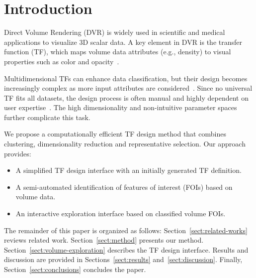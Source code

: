 \section{Introduction}
\label{sect:introduction}

Direct Volume Rendering (DVR) is widely used in scientific and medical applications to visualize 3D scalar data. A key element in DVR is the transfer function (TF), which maps volume data attributes (e.g., density) to visual properties such as color and opacity~\cite{ljung2016}.

Multidimensional TFs can enhance data classification, but their design becomes increasingly complex as more input attributes are considered~\cite{ljung2016, pan2024}. Since no universal TF fits all datasets, the design process is often manual and highly dependent on user expertise~\cite{arens2010}. The high dimensionality and non-intuitive parameter spaces further complicate this task.

We propose a computationally efficient TF design method that combines clustering, dimensionality reduction and representative selection. Our approach provides:

\begin{itemize}
    \item A simplified TF design interface with an initially generated TF definition.
    \item A semi-automated identification of features of interest (FOIs) based on volume data.
    \item An interactive exploration interface based on classified volume FOIs.
\end{itemize}

The remainder of this paper is organized as follows: Section~\ref{sect:related-works} reviews related work. Section~\ref{sect:method} presents our method. Section~\ref{sect:volume-exploration} describes the TF design interface. Results and discussion are provided in Sections~\ref{sect:results} and~\ref{sect:discussion}. Finally, Section~\ref{sect:conclusions} concludes the paper.
